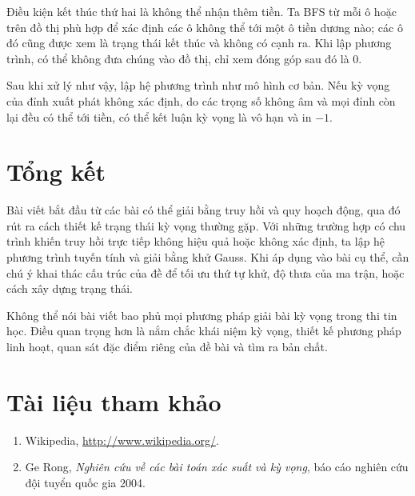 \documentclass[11pt]{article}
\begin{document}
Điều kiện kết thúc thứ hai là không thể nhận thêm tiền. Ta BFS từ mỗi ô hoặc
trên đồ thị phù hợp để xác định các ô không thể tới một ô tiền dương nào; các
ô đó cũng được xem là trạng thái kết thúc và không có cạnh ra. Khi lập phương
trình, có thể không đưa chúng vào đồ thị, chỉ xem đóng góp sau đó là \(0\).

Sau khi xử lý như vậy, lập hệ phương trình như mô hình cơ bản. Nếu kỳ vọng của
đỉnh xuất phát không xác định, do các trọng số không âm và mọi đỉnh còn lại
đều có thể tới tiền, có thể kết luận kỳ vọng là vô hạn và in \(-1\).

\section{Tổng kết}

Bài viết bắt đầu từ các bài có thể giải bằng truy hồi và quy hoạch động, qua
đó rút ra cách thiết kế trạng thái kỳ vọng thường gặp. Với những trường hợp có
chu trình khiến truy hồi trực tiếp không hiệu quả hoặc không xác định, ta lập
hệ phương trình tuyến tính và giải bằng khử Gauss. Khi áp dụng vào bài cụ thể,
cần chú ý khai thác cấu trúc của đề để tối ưu thứ tự khử, độ thưa của ma trận,
hoặc cách xây dựng trạng thái.

Không thể nói bài viết bao phủ mọi phương pháp giải bài kỳ vọng trong thi tin
học. Điều quan trọng hơn là nắm chắc khái niệm kỳ vọng, thiết kế phương pháp
linh hoạt, quan sát đặc điểm riêng của đề bài và tìm ra bản chất.

\section*{Tài liệu tham khảo}

\begin{enumerate}
  \item Wikipedia, \url{http://www.wikipedia.org/}.
  \item Ge Rong, \textit{Nghiên cứu về các bài toán xác suất và kỳ vọng}, báo
  cáo nghiên cứu đội tuyển quốc gia 2004.
\end{enumerate}
\end{document}

